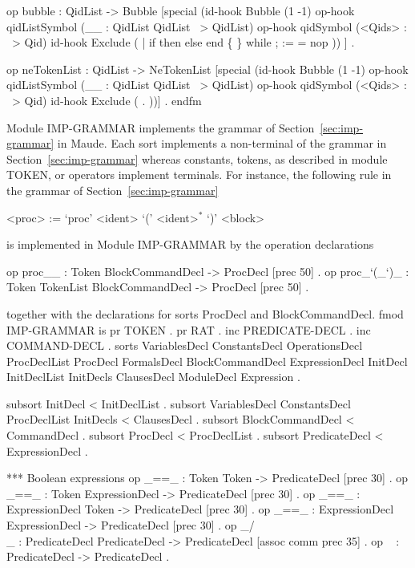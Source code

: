 \documentclass{llncs}%
\begin{document}
 op bubble : QidList -> Bubble
    [special
      (id-hook Bubble        (1 -1)
       op-hook qidListSymbol (__ : QidList QidList ~> QidList)
       op-hook qidSymbol     (<Qids> : ~> Qid)
       id-hook Exclude       ( | if then else end \{ \} 
                               while ; := = nop )) ] .

 op neTokenList : QidList -> NeTokenList
    [special
      (id-hook Bubble        (1 -1)
       op-hook qidListSymbol (__ : QidList QidList ~> QidList)
       op-hook qidSymbol     (<Qids> : ~> Qid)
       id-hook Exclude       ( . ))] .
endfm
\nwendcode{}\nwdocspar

Module {\Tt{}IMP-GRAMMAR\nwendquote} implements the grammar of Section~\ref{sec:imp-grammar} in Maude. Each sort implements a non-terminal of the grammar in Section~\ref{sec:imp-grammar} whereas constants, tokens, as described in module {\Tt{}TOKEN\nwendquote}, or operators implement terminals. For instance, the following rule in the grammar of Section~\ref{sec:imp-grammar}
\begin{grammar}
<proc> := `proc' <ident> `(' <ident>$^*$ `)' <block>
\end{grammar}
is implemented in Module {\Tt{}IMP-GRAMMAR\nwendquote} by the operation declarations
\begin{maude}
 op proc__ : Token BlockCommandDecl -> ProcDecl [prec 50] .
 op proc_`(_`)_ : Token TokenList BlockCommandDecl -> ProcDecl [prec 50] .
\end{maude}
together with the declarations for sorts {\Tt{}ProcDecl\nwendquote} and {\Tt{}BlockCommandDecl\nwendquote}.
\nwenddocs{}\endmoddef\nwstartdeflinemarkup\nwenddeflinemarkup
fmod IMP-GRAMMAR is
 pr TOKEN .
 pr RAT .
 inc PREDICATE-DECL .
 inc COMMAND-DECL .
 sorts VariablesDecl ConstantsDecl OperationsDecl ProcDeclList
       ProcDecl FormalsDecl BlockCommandDecl ExpressionDecl
       InitDecl InitDeclList InitDecls ClausesDecl
       ModuleDecl Expression .

 subsort InitDecl < InitDeclList .
 subsort VariablesDecl ConstantsDecl ProcDeclList 
         InitDecls < ClausesDecl .
 subsort BlockCommandDecl < CommandDecl .
 subsort ProcDecl < ProcDeclList .
 subsort PredicateDecl < ExpressionDecl .

 *** Boolean expressions
 op _==_ : Token Token -> PredicateDecl [prec 30] .
 op _==_ : Token ExpressionDecl -> PredicateDecl [prec 30] .
 op _==_ : ExpressionDecl Token -> PredicateDecl [prec 30] .
 op _==_ : ExpressionDecl ExpressionDecl -> PredicateDecl 
           [prec 30] .
 op _/\\_ : PredicateDecl PredicateDecl -> PredicateDecl 
           [assoc comm prec 35] .
 op ~ : PredicateDecl -> PredicateDecl .
\end{document}

